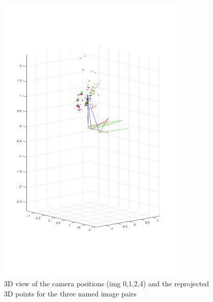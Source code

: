 \documentclass[12pt]{article}
\begin{document}
\begin{figure}[H]
	\centering
	\includegraphics[width=0.8\textwidth]{6.jpg}
	\caption{3D view of the camera positions (img 0,1,2,4) and the reprojected 3D points for the three named image pairs}
	\label{fig1}
\end{figure}
\vspace{5mm}
\end{document}
